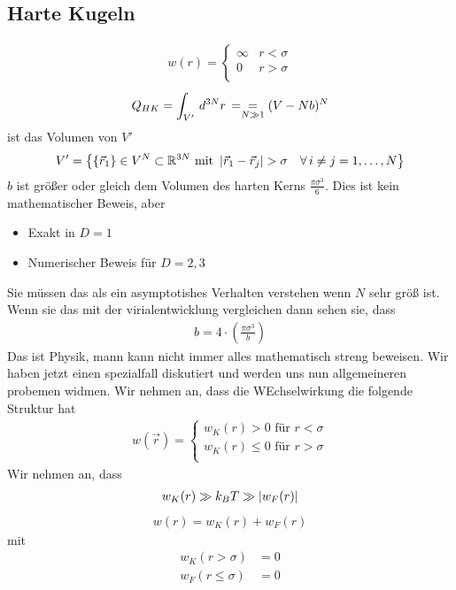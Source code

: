 \subsection*{Harte Kugeln}
%
\begin{align*}
  w(r) = \begin{cases}
    \infty & r < \sigma \\
    0 & r > \sigma \\
  \end{cases} 
\end{align*}
%
%
\begin{align*}
  Q_{HK} = \int_{V'}^{} \,d^{3N}r\, = \underset{N \gg 1}{ = } (V - N b)^N
\end{align*}
%
ist das Volumen von $V'$
%
%
\begin{align*}
  V' = \left\{ \{\vec{r}_1\} \in V^N \subset \mathbb{R}^{3N} 
  \text{ mit } \left| \vec{r}_1 - \vec{r}_{j} \right| > \sigma \quad\forall\,
 i\neq j = 1, \ldots , N\right\}
\end{align*}
%
$b$ ist gr\"o\ss{}er oder gleich dem Volumen des harten Kerns
$\frac{\pi \sigma^3}{6}$.
Dies ist kein mathematischer Beweis, aber
\begin{itemize}
  \item Exakt in $D=1$
  \item Numerischer Beweis f\"ur $D = 2, 3$
\end{itemize}
Sie m\"ussen das als ein asymptotishes Verhalten
verstehen wenn $N $ sehr gr\"o\ss{} ist. Wenn sie das mit der virialentwicklung
vergleichen dann sehen sie, dass
%
\begin{align*}
  b = 4 \cdot \left( \frac{\pi \sigma^3 }{b} \right)
\end{align*}
%
Das ist Physik, mann kann nicht immer alles mathematisch streng beweisen.  Wir
haben jetzt einen spezialfall diskutiert und werden uns nun allgemeineren
probemen widmen. Wir nehmen an, dass die WEchselwirkung die folgende Struktur hat
%
\begin{align*}
  w(\vec{r}) = \begin{cases}
    w_K(r) > 0 \text{ f\"ur } r  < \sigma \\
    w_K(r) \le 0 \text{ f\"ur } r  > \sigma \\
  \end{cases} 
\end{align*}
%
Wir nehmen an, dass
%
\begin{align*}
  w_K(r) \gg k_B T \gg \left|  w_F (r) \right|
\end{align*}
%
\begin{align*}
  w(r) = w_K(r) + w_F(r)
\end{align*}
%
mit 
%
\begin{align*}
  w_K(r > \sigma) &= 0 \\
  w_F(r \le \sigma)& = 0 \\
\end{align*}
%

